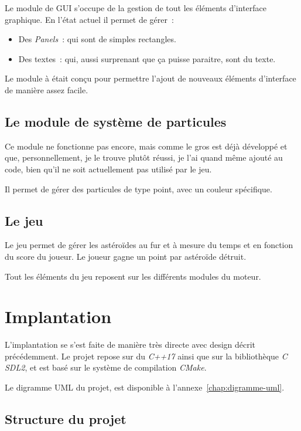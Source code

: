 \documentclass[10pt, french, a4paper]{report}
\begin{document}
Le module de GUI s'occupe de la gestion de tout les éléments d'interface graphique.
En l'état actuel il permet de gérer~:
\begin{itemize}
	\item Des \textit{Panels}~: qui sont de simples rectangles.
	\item Des textes~: qui, aussi surprenant que ça puisse paraitre, sont du texte.
\end{itemize}

Le module à était conçu pour permettre l'ajout de nouveaux éléments d'interface de 
manière assez facile. 

\section{Le module de système de particules}

Ce module ne fonctionne pas encore, mais comme le gros est déjà développé et que, 
personnellement, je le trouve plutôt réussi, je l'ai quand même ajouté au code, bien
qu'il ne soit actuellement pas utilisé par le jeu.

Il permet de gérer des particules de type point, avec un couleur spécifique.

\section{Le jeu}

Le jeu permet de gérer les astéroïdes au fur et à mesure du temps et en fonction 
du score du joueur. 
Le joueur gagne un point par astéroïde détruit. 

Tout les éléments du jeu reposent sur les différents modules du moteur.


\chapter{Implantation}

L'implantation se s'est faite de manière très directe avec design décrit précédemment.
Le projet repose sur du \textit{C++17} ainsi que sur la bibliothèque \textit{C}
\textit{SDL2}, et est basé sur le système de compilation \textit{CMake}.

Le digramme UML du projet, est disponible à l'annexe~\ref{chap:digramme-uml}.

\section{Structure du projet}
\end{document}

